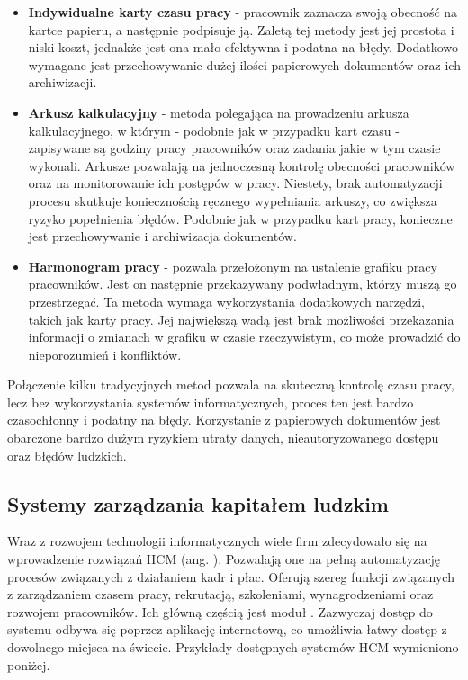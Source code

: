 \begin{itemize}
    \item \textbf{Indywidualne karty czasu pracy} - pracownik zaznacza swoją obecność na kartce papieru, a następnie podpisuje ją. Zaletą tej metody jest jej prostota i niski koszt, jednakże jest ona mało efektywna i podatna na błędy. Dodatkowo wymagane jest przechowywanie dużej ilości papierowych dokumentów oraz ich archiwizacji.
    \item \textbf{Arkusz kalkulacyjny} - metoda polegająca na prowadzeniu arkusza kalkulacyjnego, w którym - podobnie jak w przypadku kart czasu - zapisywane są godziny pracy pracowników oraz zadania jakie w tym czasie wykonali. Arkusze pozwalają na jednoczesną kontrolę obecności pracowników oraz na monitorowanie ich postępów w pracy. Niestety, brak automatyzacji procesu skutkuje koniecznością ręcznego wypełniania arkuszy, co zwiększa ryzyko popełnienia błędów. Podobnie jak w przypadku kart pracy, konieczne jest przechowywanie i archiwizacja dokumentów.
    \item \textbf{Harmonogram pracy} - pozwala przełożonym na ustalenie grafiku pracy pracowników. Jest on następnie przekazywany podwładnym, którzy muszą go przestrzegać. Ta metoda wymaga wykorzystania dodatkowych narzędzi, takich jak karty pracy. Jej największą wadą jest brak możliwości przekazania informacji o zmianach w grafiku w czasie rzeczywistym, co może prowadzić do nieporozumień i konfliktów.
\end{itemize}

Połączenie kilku tradycyjnych metod pozwala na skuteczną kontrolę czasu pracy, lecz bez wykorzystania systemów informatycznych, proces ten jest bardzo czasochłonny i podatny na błędy. Korzystanie z papierowych dokumentów jest obarczone bardzo dużym ryzykiem utraty danych, nieautoryzowanego dostępu oraz błędów ludzkich.

\subsection{Systemy zarządzania kapitałem ludzkim}

Wraz z rozwojem technologii informatycznych wiele firm zdecydowało się na wprowadzenie rozwiązań HCM (ang. ). Pozwalają one na pełną automatyzację procesów związanych z działaniem kadr i płac. Oferują szereg funkcji związanych z zarządzaniem czasem pracy, rekrutacją, szkoleniami, wynagrodzeniami oraz rozwojem pracowników. Ich główną częścią jest moduł . Zazwyczaj dostęp do systemu odbywa się poprzez aplikację internetową, co umożliwia łatwy dostęp z dowolnego miejsca na świecie. Przykłady dostępnych systemów HCM wymieniono poniżej.

